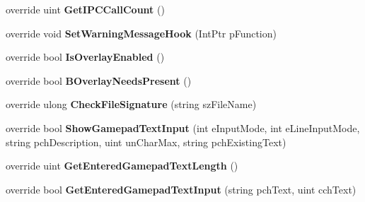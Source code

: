\begin{DoxyCompactItemize}
\item 
\mbox{\label{class_valve_1_1_steamworks_1_1_c_steam_utils_a633b8fd09392950eac0bbfd0945f8fd5}} 
override uint {\bfseries Get\+I\+P\+C\+Call\+Count} ()
\item 
\mbox{\label{class_valve_1_1_steamworks_1_1_c_steam_utils_af34d70923245332d13b24b28ba406e38}} 
override void {\bfseries Set\+Warning\+Message\+Hook} (Int\+Ptr p\+Function)
\item 
\mbox{\label{class_valve_1_1_steamworks_1_1_c_steam_utils_ac908638f0a3aeb8c63c2b49da96d7361}} 
override bool {\bfseries Is\+Overlay\+Enabled} ()
\item 
\mbox{\label{class_valve_1_1_steamworks_1_1_c_steam_utils_ac4e03a9f3bb237dae44266558bce337d}} 
override bool {\bfseries B\+Overlay\+Needs\+Present} ()
\item 
\mbox{\label{class_valve_1_1_steamworks_1_1_c_steam_utils_ad7401bd13f0ac8a6fd8991e5cd7182ab}} 
override ulong {\bfseries Check\+File\+Signature} (string sz\+File\+Name)
\item 
\mbox{\label{class_valve_1_1_steamworks_1_1_c_steam_utils_a62908db16e75f19e246eba8f619570b1}} 
override bool {\bfseries Show\+Gamepad\+Text\+Input} (int e\+Input\+Mode, int e\+Line\+Input\+Mode, string pch\+Description, uint un\+Char\+Max, string pch\+Existing\+Text)
\item 
\mbox{\label{class_valve_1_1_steamworks_1_1_c_steam_utils_ab6822b494eec6c3917c4ce29c2763ef0}} 
override uint {\bfseries Get\+Entered\+Gamepad\+Text\+Length} ()
\item 
\mbox{\label{class_valve_1_1_steamworks_1_1_c_steam_utils_aa99802aa51895b9343a1f068cb5695cb}} 
override bool {\bfseries Get\+Entered\+Gamepad\+Text\+Input} (string pch\+Text, uint cch\+Text)
\item 
\mbox{\label{class_valve_1_1_steamworks_1_1_c_steam_utils_a2d7b8d89bb4150045d189a641a044fa5}} 

\end{DoxyCompactItemize}
